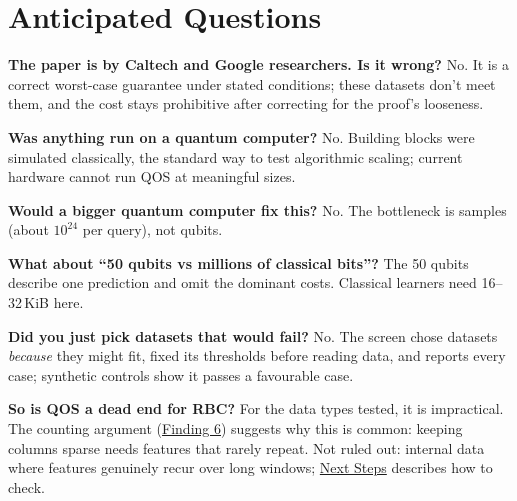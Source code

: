 \documentclass[10pt]{article}
\newenvironment{sectionblock}
{%
    \par
    \vspace{2pt}
    \noindent
    \begin{minipage}{\textwidth}
}
{%
    \end{minipage}
    \par
    \vspace{5pt}
}
\begin{document}
\begin{sectionblock}

\section{Anticipated Questions}
\label{sec:faq}

\textbf{The paper is by Caltech and Google researchers. Is it wrong?}
No. It is a correct worst-case guarantee under stated conditions; these datasets don't meet them, and the cost stays prohibitive after correcting for the proof's looseness.

\textbf{Was anything run on a quantum computer?}
No. Building blocks were simulated classically, the standard way to test algorithmic scaling; current hardware cannot run QOS at meaningful sizes.

\textbf{Would a bigger quantum computer fix this?}
No. The bottleneck is samples (about $10^{24}$ per query), not qubits.

\textbf{What about ``50 qubits vs millions of classical bits''?}
The 50 qubits describe one prediction and omit the dominant costs. Classical learners need 16--32\,KiB here.

\textbf{Did you just pick datasets that would fail?}
No. The screen chose datasets \emph{because} they might fit, fixed its thresholds before reading data, and reports every case; synthetic controls show it passes a favourable case.

\textbf{So is QOS a dead end for RBC?}
For the data types tested, it is impractical. The counting argument (\hyperref[sec:f6]{Finding 6}) suggests why this is common: keeping columns sparse needs features that rarely repeat. Not ruled out: internal data where features genuinely recur over long windows; \hyperref[sec:next]{Next Steps} describes how to check.

\end{sectionblock}
\end{document}
